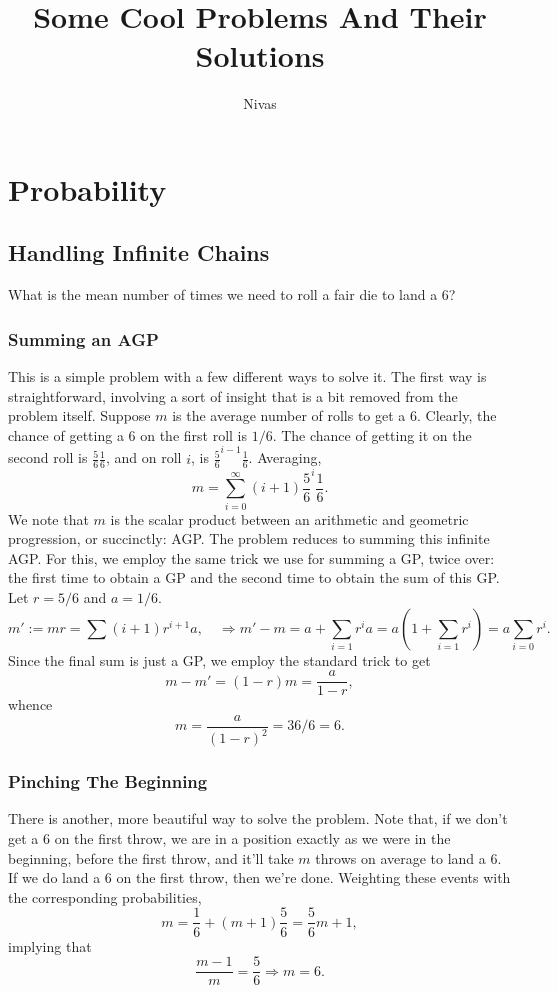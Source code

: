 \documentclass[reqno]{amsart}
\title{Some Cool Problems And Their Solutions}
\author{Nivas}
\begin{document}
\maketitle
\newpage
\section{Probability}
\subsection{Handling Infinite Chains}
What is the mean number of times we need to roll a fair die to land a 6?

\subsubsection{Summing an AGP}
This is a simple problem with a few different ways to solve it. The first way is straightforward, involving a sort of insight that is a bit removed from the problem itself. Suppose $m$ is the average number of rolls to get a 6. Clearly, the chance of getting a 6 on the first roll is $1/6$. The chance of getting it on the second roll is $\displaystyle \frac{5}{6} \frac{1}{6}$, and on roll $i$, is $\displaystyle \frac{5}{6}^{i-1} \frac{1}{6}$. Averaging, 
\[ m = \sum_{i=0} ^{\infty} (i+1) \frac{5}{6}^{i} \frac{1}{6}. \]
We note that $m$ is the scalar product between an arithmetic and geometric progression, or succinctly: AGP. The problem reduces to summing this infinite AGP. For this, we employ the same trick we use for summing a GP, twice over: the first time to obtain a GP and the second time to obtain the sum of this GP. Let $r = 5/6$ and $a = 1/6$.
\[  m' := m r = \sum (i+1) r^{i+1} a, \quad \Rightarrow m' - m = a + \sum_{i=1} r^i a = a \left( 1 + \sum_{i=1} r^i \right) = a \sum_{i = 0} r^i . \]
Since the final sum is just a GP, we employ the standard trick to get 
\[ m - m' = (1 - r)m = \frac{a}{1 - r},  \]
whence
\[ m = \frac{a}{(1 - r)^2} = 36/6 = 6. \]

\subsubsection{Pinching The Beginning}
There is another, more beautiful way to solve the problem. Note that, if we don't get a 6 on the first throw, we are in a position exactly as we were in the beginning, before the first throw, and it'll take $m$ throws on average to land a 6. If we do land a 6 on the first throw, then we're done. Weighting these events with the corresponding probabilities, 
\[ m = \frac{1}{6} + (m+1)\frac{5}{6} = \frac{5}{6}m + 1, \]
implying that
\[ \frac{m-1}{m} = \frac{5}{6} \Rightarrow m = 6.  \]
\end{document}
